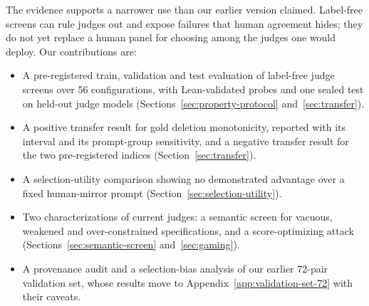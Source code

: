 The evidence supports a narrower use than our earlier version claimed.
Label-free screens can rule judges out and expose failures that human agreement hides; they do not yet replace a human panel for choosing among the judges one would deploy.
Our contributions are:
\begin{itemize}
\item A pre-registered train, validation and test evaluation of label-free judge screens over 56 configurations, with Lean-validated probes and one sealed test on held-out judge models (Sections~\ref{sec:property-protocol} and~\ref{sec:transfer}).
\item A positive transfer result for gold deletion monotonicity, reported with its interval and its prompt-group sensitivity, and a negative transfer result for the two pre-registered indices (Section~\ref{sec:transfer}).
\item A selection-utility comparison showing no demonstrated advantage over a fixed human-mirror prompt (Section~\ref{sec:selection-utility}).
\item Two characterizations of current judges: a semantic screen for vacuous, weakened and over-constrained specifications, and a score-optimizing attack (Sections~\ref{sec:semantic-screen} and~\ref{sec:gaming}).
\item A provenance audit and a selection-bias analysis of our earlier 72-pair validation set, whose results move to Appendix~\ref{app:validation-set-72} with their caveats.
\end{itemize}
